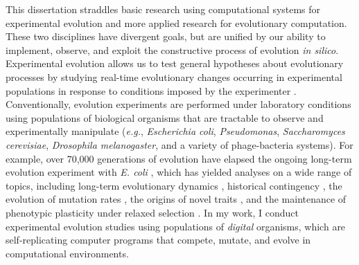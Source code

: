 


This dissertation straddles basic research using computational systems for experimental evolution and more applied research for evolutionary computation.
These two disciplines have divergent goals, but are unified by our ability to implement, observe, and exploit the constructive process of evolution \textit{in silico}.
Experimental evolution allows us to test general hypotheses about evolutionary processes by studying real-time evolutionary changes occurring in experimental populations in response to conditions imposed by the experimenter \citep{kawecki_experimental_2012}.
Conventionally, evolution experiments are performed under laboratory conditions using populations of biological organisms that are tractable to observe and experimentally manipulate (\textit{e.g.}, \textit{Escherichia coli}, \textit{Pseudomonas}, \textit{Saccharomyces cerevisiae}, \textit{Drosophila melanogaster}, and a variety of phage-bacteria systems).
For example, over 70,000 generations of evolution have elapsed the ongoing long-term evolution experiment with \textit{E. coli} \citep{barrick_test_2020}, which has yielded analyses on a wide range of topics, including
long-term evolutionary dynamics \citep{wiser_long-term_2013,good_dynamics_2017},
historical contingency \citep{travisano_experimental_1995,card_historical_2019},
the evolution of mutation rates \citep{sniegowski_evolution_1997},
the origins of novel traits \citep{blount_historical_2008},
and the maintenance of phenotypic plasticity under relaxed selection \citep{grant_maintenance_2020}.
In my work, I conduct experimental evolution studies using populations of \textit{digital} organisms, which are self-replicating computer programs that compete, mutate, and evolve in computational environments.

